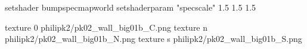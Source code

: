 setshader bumpspecmapworld
setshaderparam "specscale" 1.5 1.5 1.5

texture 0 philipk2/pk02_wall_big01b_C.png
texture n philipk2/pk02_wall_big01b_N.png
texture s philipk2/pk02_wall_big01b_S.png

